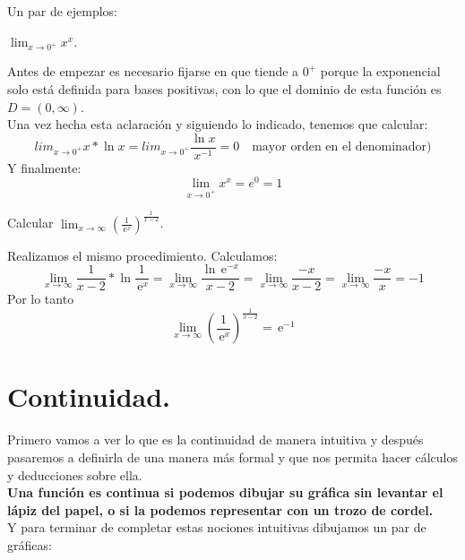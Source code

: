 \documentclass[a4paper,11pt,answers]{exam}
\newcommand{\e}{\,\mathrm{e}}
\begin{document}
Un par de ejemplos:
\begin{questions}
\question $\lim_{x \to 0^+} x^x$.
\begin{solution}
Antes de empezar es necesario fijarse en que tiende a $0^+$ porque la exponencial solo está definida para bases positivas, con lo que el dominio de esta función es $D=(0, \infty)$.\\

Una vez hecha esta aclaración y siguiendo lo indicado, tenemos que calcular:
\[lim_{x \to 0^+} x*\ln x = lim_{x \to 0^+} \frac{\ln x}{x^{-1}} = 0 \quad \text{mayor orden en el denominador)}\]
Y finalmente:
\[\lim_{x \to 0^+} x^x = e^0 = 1\]
\end{solution}

\question Calcular $\lim_{x \to \infty} \left(\frac{1}{\e^x}\right)^\frac{1}{x - 2}$.
\begin{solution}
Realizamos el mismo procedimiento. Calculamos:
\[\lim_{x \to \infty} \frac{1}{x-2}*\ln \frac{1}{\e^x} = \lim_{x \to \infty} \frac{\ln \e^{-x}}{x - 2} = 
\lim_{x \to \infty} \frac{-x}{x-2} = \lim_{x \to \infty} \frac{-x}{x} = -1\]
Por lo tanto
\[\lim_{x \to \infty} \left(\frac{1}{\e^x}\right)^\frac{1}{x - 2} = \e^{-1}\]
\end{solution}
\end{questions}
\section{Continuidad.}
Primero vamos a ver lo que es la continuidad de manera intuitiva y después pasaremos a definirla de una manera más formal y que nos permita hacer cálculos y deducciones sobre ella.\\

\textbf{Una función es continua si podemos dibujar su gráfica sin levantar el lápiz del papel, o si la podemos representar con un trozo de cordel.}\\
Y para terminar de completar estas nociones intuitivas dibujamos un par de gráficas:
\end{document}
